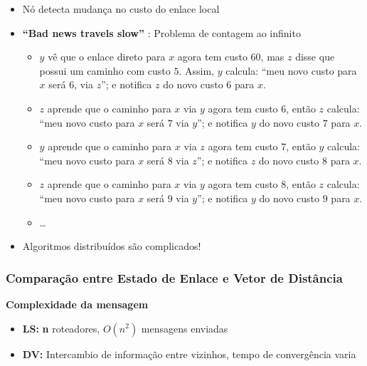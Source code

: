 \begin{itemize}[left=0.5cm, align=left, nosep]
                \item Nó detecta mudança no custo do enlace local
                \item \textbf{``Bad news travels slow''} : Problema de contagem ao infinito
                \begin{itemize}[left=0.5cm, nosep, label=$\hookrightarrow$]
                    \item $y$ vê que o enlace direto para $x$ agora tem custo $60$, mas $z$ disse que possui um caminho com custo $5$. Assim, $y$ calcula: “meu novo custo para $x$ será $6$, via $z$”; e notifica $z$ do novo custo $6$ para $x$.
                    \item $z$ aprende que o caminho para $x$ via $y$ agora tem custo $6$, então $z$ calcula: “meu novo custo para $x$ será $7$ via $y$”; e notifica $y$ do novo custo $7$ para $x$.
                    \item $y$ aprende que o caminho para $x$ via $z$ agora tem custo $7$, então $y$ calcula: “meu novo custo para $x$ será $8$ via $z$”; e notifica $z$ do novo custo $8$ para $x$.
                    \item $z$ aprende que o caminho para $x$ via $y$ agora tem custo $8$, então $z$ calcula: “meu novo custo para $x$ será $9$ via $y$”; e notifica $y$ do novo custo $9$ para $x$.
                    \item \dots
                \end{itemize}

                \item Algoritmos distribuídos são complicados!

            \end{itemize}

        \subsubsection*{Comparação entre Estado de Enlace e Vetor de Distância}

            \textbf{Complexidade da mensagem} 
            \begin{itemize}[left=0.5cm, align=left, nosep]
                \item \textbf{LS:} \textbf{n} roteadores, $O(n^2)$ mensagens enviadas 
                \item \textbf{DV:} Intercambio de informação entre vizinhos, tempo de convergência varia
            \end{itemize}

